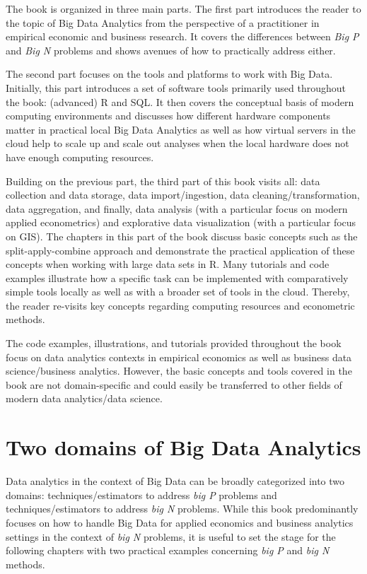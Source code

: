 \documentclass[
  12pt,
]{style/krantz}
\begin{document}
The book is organized in three main parts. The first part introduces the reader to the topic of Big Data Analytics from the perspective of a practitioner in empirical economic and business research. It covers the differences between \emph{Big P} and \emph{Big N} problems and shows avenues of how to practically address either.

The second part focuses on the tools and platforms to work with Big Data. Initially, this part introduces a set of software tools primarily used throughout the book: (advanced) R and SQL. It then covers the conceptual basis of modern computing environments and discusses how different hardware components matter in practical local Big Data Analytics as well as how virtual servers in the cloud help to scale up and scale out analyses when the local hardware does not have enough computing resources.

Building on the previous part, the third part of this book visits all: data collection and data storage, data import/ingestion, data cleaning/transformation, data aggregation, and finally, data analysis (with a particular focus on modern applied econometrics) and explorative data visualization (with a particular focus on GIS). The chapters in this part of the book discuss basic concepts such as the split-apply-combine approach and demonstrate the practical application of these concepts when working with large data sets in R. Many tutorials and code examples illustrate how a specific task can be implemented with comparatively simple tools locally as well as with a broader set of tools in the cloud. Thereby, the reader re-visits key concepts regarding computing resources and econometric methods.

The code examples, illustrations, and tutorials provided throughout the book focus on data analytics contexts in empirical economics as well as business data science/business analytics. However, the basic concepts and tools covered in the book are not domain-specific and could easily be transferred to other fields of modern data analytics/data science.

\hypertarget{two-domains-of-big-data-analytics}{%
\chapter{Two domains of Big Data Analytics}\label{two-domains-of-big-data-analytics}}

Data analytics in the context of Big Data can be broadly categorized into two domains: techniques/estimators to address \emph{big P} problems and techniques/estimators to address \emph{big N} problems. While this book predominantly focuses on how to handle Big Data for applied economics and business analytics settings in the context of \emph{big N} problems, it is useful to set the stage for the following chapters with two practical examples concerning \emph{big P} and \emph{big N} methods.
\end{document}
